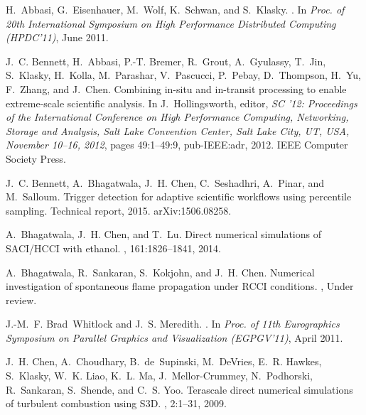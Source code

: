 \documentclass{sig-alternate}
\begin{document}
\clearpage
\begin{thebibliography}{10}

H.~Abbasi, G.~Eisenhauer, M.~Wolf, K.~Schwan, and S.~Klasky.
.
\newblock In {\em Proc. of 20th International Symposium on High Performance
  Distributed Computing (HPDC'11)}, June 2011.

J.~C. Bennett, H.~Abbasi, P.-T. Bremer, R.~Grout, A.~Gyulassy, T.~Jin,
  S.~Klasky, H.~Kolla, M.~Parashar, V.~Pascucci, P.~Pebay, D.~Thompson, H.~Yu,
  F.~Zhang, and J.~Chen.
\newblock Combining in-situ and in-transit processing to enable extreme-scale
  scientific analysis.
\newblock In J.~Hollingsworth, editor, {\em {SC} '12: Proceedings of the
  International Conference on High Performance Computing, Networking, Storage
  and Analysis, Salt Lake Convention Center, Salt Lake City, {UT}, {USA},
  November 10--16, 2012}, pages 49:1--49:9, pub-IEEE:adr, 2012. IEEE Computer
  Society Press.

J.~C. Bennett, A.~Bhagatwala, J.~H. Chen, C.~Seshadhri, A.~Pinar, and
  M.~Salloum.
\newblock Trigger detection for adaptive scientific workflows using percentile
  sampling.
\newblock Technical report, 2015.
\newblock arXiv:1506.08258.

A.~Bhagatwala, J.~H. Chen, and T.~Lu.
\newblock Direct numerical simulations of {SACI}/{HCCI} with ethanol.
, 161:1826--1841, 2014.

A.~Bhagatwala, R.~Sankaran, S.~Kokjohn, and J.~H. Chen.
\newblock Numerical investigation of spontaneous flame propagation under {RCCI}
  conditions.
, Under review.

J.-M.~F. Brad~Whitlock and J.~S. Meredith.
.
\newblock In {\em Proc. of 11th Eurographics Symposium on Parallel Graphics and
  Visualization (EGPGV'11)}, April 2011.

J.~H. Chen, A.~Choudhary, B.~de~Supinski, M.~DeVries, E.~R. Hawkes, S.~Klasky,
  W.~K. Liao, K.~L. Ma, J.~Mellor-Crummey, N.~Podhorski, R.~Sankaran,
  S.~Shende, and C.~S. Yoo.
\newblock Terascale direct numerical simulations of turbulent combustion using
  {S}3{D}.
, 2:1--31, 2009.


\end{thebibliography}
\end{document}
